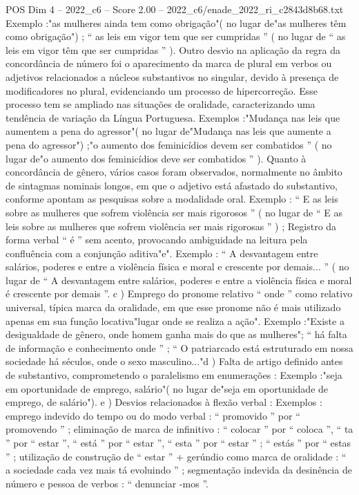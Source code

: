 \begin{textsample}{POS Dim 4 – 2022\_c6 – Score 2.00 – 2022\_c6/enade\_2022\_ri\_c2843d8b68.txt}
Exemplo :"as mulheres ainda tem como obrigação"( no lugar de"as mulheres têm como obrigação") ; “ as leis em vigor tem que ser cumpridas ” ( no lugar de “ as leis em vigor têm que ser cumpridas ” ).
Outro desvio na aplicação da regra da concordância de número foi o aparecimento da marca de plural em verbos ou adjetivos relacionados a núcleos substantivos no singular, devido à presença de modificadores no plural, evidenciando um processo de hipercorreção.
Esse processo tem se ampliado nas situações de oralidade, caracterizando uma tendência de variação da Língua Portuguesa.
Exemplos :"Mudança nas leis que aumentem a pena do agressor"( no lugar de"Mudança nas leis que aumente a pena do agressor") ;"o aumento dos feminicídios devem ser combatidos ” ( no lugar de"o aumento dos feminicídios deve ser combatidos ” ).
Quanto à concordância de gênero, vários casos foram observados, normalmente no âmbito de sintagmas nominais longos, em que o adjetivo está afastado do substantivo, conforme apontam as pesquisas sobre a modalidade oral.
Exemplo : “ E as leis sobre as mulheres que sofrem violência ser mais rigorosos ” ( no lugar de “ E as leis sobre as mulheres que sofrem violência ser mais rigorosas ” ) ; Registro da forma verbal “ é ” sem acento, provocando ambiguidade na leitura pela confluência com a conjunção aditiva"e".
Exemplo : “ A desvantagem entre salários, poderes e entre a violência física e moral e crescente por demais... ” ( no lugar de “ A desvantagem entre salários, poderes e entre a violência física e moral é crescente por demais ”. c ) Emprego do pronome relativo “ onde ” como relativo universal, típica marca da oralidade, em que esse pronome não é mais utilizado apenas em sua função locativa"lugar onde se realiza a ação".
Exemplo :"Existe a desigualdade de gênero, onde homem ganha mais do que as mulheres"; “ há falta de informação e conhecimento onde ” ; “ O patriarcado está estruturado em nossa sociedade há séculos, onde o sexo masculino..."d ) Falta de artigo definido antes de substantivo, comprometendo o paralelismo em enumerações : Exemplo :"seja em oportunidade de emprego, salário"( no lugar de"seja em oportunidade de emprego, de salário"). e ) Desvios relacionados à flexão verbal : Exemplos : emprego indevido do tempo ou do modo verbal : “ promovido ” por “ promovendo ” ; eliminação de marca de infinitivo : “ colocar ” por “ coloca ”, “ ta ” por “ estar ”, “ está ” por “ estar ”, “ esta ” por “ estar ” ; “ estás ” por “ estas ” ; utilização de construção de “ estar ” + gerúndio como marca de oralidade : “ a sociedade cada vez mais tá evoluindo ” ; segmentação indevida da desinência de número e pessoa de verbos : “ denunciar -mos ”.

\end{textsample}
